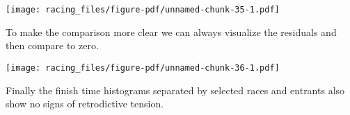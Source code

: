 \documentclass[
  letterpaper,
  DIV=11,
  numbers=noendperiod]{scrartcl}
\newenvironment{Shaded}{\begin{snugshade}}{\end{snugshade}}
\newcommand{\AttributeTok}[1]{\textcolor[rgb]{0.40,0.45,0.13}{#1}}
\newcommand{\ConstantTok}[1]{\textcolor[rgb]{0.56,0.35,0.01}{#1}}
\newcommand{\ControlFlowTok}[1]{\textcolor[rgb]{0.00,0.23,0.31}{#1}}
\newcommand{\DecValTok}[1]{\textcolor[rgb]{0.68,0.00,0.00}{#1}}
\newcommand{\FunctionTok}[1]{\textcolor[rgb]{0.28,0.35,0.67}{#1}}
\newcommand{\NormalTok}[1]{\textcolor[rgb]{0.00,0.23,0.31}{#1}}
\newcommand{\OtherTok}[1]{\textcolor[rgb]{0.00,0.23,0.31}{#1}}
\newcommand{\SpecialCharTok}[1]{\textcolor[rgb]{0.37,0.37,0.37}{#1}}
\newcommand{\StringTok}[1]{\textcolor[rgb]{0.13,0.47,0.30}{#1}}
\begin{document}
\texttt{[image: racing\_files/figure-pdf/unnamed-chunk-35-1.pdf]}

To make the comparison more clear we can always visualize the residuals
and then compare to zero.

\begin{Shaded}
\end{Shaded}

\texttt{[image: racing\_files/figure-pdf/unnamed-chunk-36-1.pdf]}

Finally the finish time histograms separated by selected races and
entrants also show no signs of retrodictive tension.
\end{document}
